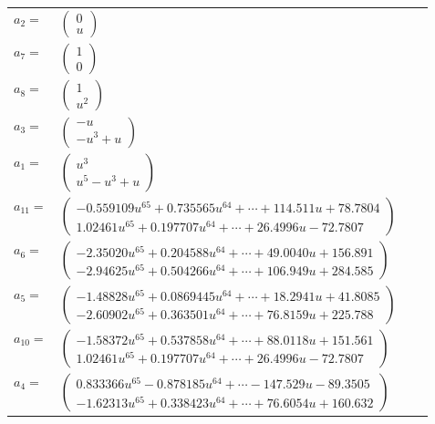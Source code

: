 \documentclass[1p]{elsarticle_modified}
\theoremstyle{definition}
\begin{document}
\begin{tabular}{m{7pt} m{180pt} m{7pt} m{180pt} }
\flushright $a_{2}=$&$\begin{pmatrix}0\\u\end{pmatrix}$ \\
\flushright $a_{7}=$&$\begin{pmatrix}1\\0\end{pmatrix}$ \\
\flushright $a_{8}=$&$\begin{pmatrix}1\\u^2\end{pmatrix}$ \\
\flushright $a_{3}=$&$\begin{pmatrix}- u\\- u^3+u\end{pmatrix}$ \\
\flushright $a_{1}=$&$\begin{pmatrix}u^3\\u^5- u^3+u\end{pmatrix}$ \\
\flushright $a_{11}=$&$\begin{pmatrix}-0.559109 u^{65}+0.735565 u^{64}+\cdots+114.511 u+78.7804\\1.02461 u^{65}+0.197707 u^{64}+\cdots+26.4996 u-72.7807\end{pmatrix}$ \\
\flushright $a_{6}=$&$\begin{pmatrix}-2.35020 u^{65}+0.204588 u^{64}+\cdots+49.0040 u+156.891\\-2.94625 u^{65}+0.504266 u^{64}+\cdots+106.949 u+284.585\end{pmatrix}$ \\
\flushright $a_{5}=$&$\begin{pmatrix}-1.48828 u^{65}+0.0869445 u^{64}+\cdots+18.2941 u+41.8085\\-2.60902 u^{65}+0.363501 u^{64}+\cdots+76.8159 u+225.788\end{pmatrix}$ \\
\flushright $a_{10}=$&$\begin{pmatrix}-1.58372 u^{65}+0.537858 u^{64}+\cdots+88.0118 u+151.561\\1.02461 u^{65}+0.197707 u^{64}+\cdots+26.4996 u-72.7807\end{pmatrix}$ \\
\flushright $a_{4}=$&$\begin{pmatrix}0.833366 u^{65}-0.878185 u^{64}+\cdots-147.529 u-89.3505\\-1.62313 u^{65}+0.338423 u^{64}+\cdots+76.6054 u+160.632\end{pmatrix}$ \\

\end{tabular}
\end{document}
